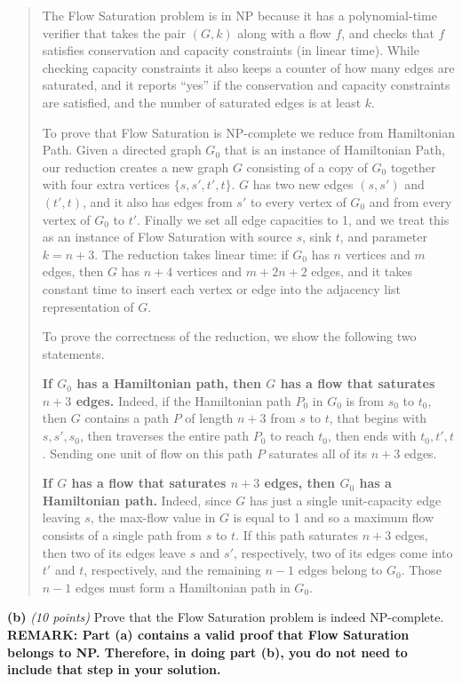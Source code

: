 \documentclass[11pt]{article}
\def\gap{0.1in}
\def\bigap{0.25in}
\begin{document}
\begin{quotation}
The {\sc Flow Saturation} problem is in NP because it has
a polynomial-time verifier that takes the pair $(G,k)$ along
with a flow $f$, and checks that $f$ satisfies conservation
and capacity constraints (in linear time).  While checking
capacity constraints it also keeps a counter of how many
edges are saturated, and it reports ``yes'' if the conservation
and capacity constraints are satisfied, and the number of 
saturated edges is at least $k$.

To prove that {\sc Flow Saturation} is NP-complete we reduce
from {\sc Hamiltonian Path}.  Given a directed graph $G_0$ that
is an instance of {\sc Hamiltonian Path}, our reduction creates
a new graph $G$ consisting of a copy of $G_0$ together with
four extra vertices $\{s,s',t',t\}$.  $G$ has two new edges $(s,s')$
and $(t',t)$, and it also has edges from $s'$ to every vertex
of $G_0$ and from every vertex of $G_0$ to $t'$.  Finally we set
all edge capacities to 1, and we treat this as an instance of
{\sc Flow Saturation} with source $s$, sink $t$, and parameter
$k=n+3$.  The reduction takes linear time: if $G_0$ has $n$
vertices and $m$ edges, then $G$ has $n+4$ vertices and 
$m+2n+2$ edges, and it takes constant time to insert each
vertex or edge into the adjacency list representation of 
$G$.

To prove the correctness of the reduction, we show the
following two statements.  

{\bf If $G_0$ has a Hamiltonian
path, then $G$ has a flow that saturates $n+3$ edges.} 
Indeed, if the Hamiltonian path $P_0$ in $G_0$ is from $s_0$
to $t_0$, then $G$ contains a path $P$ of length $n+3$ from
$s$ to $t$, that begins with $s,s',s_0$, then traverses
the entire path $P_0$ to reach $t_0$, then ends with $t_0,t',t$.
Sending one unit of flow on this path $P$ saturates all of
its $n+3$ edges.  

{\bf If $G$ has a flow that saturates 
$n+3$ edges, then $G_0$ has a Hamiltonian path.}  Indeed,
since $G$ has just a single unit-capacity edge leaving $s$,
the max-flow value in $G$ is equal to 1 and so a maximum
flow consists of a single path from $s$ to $t$.  If this 
path saturates $n+3$ edges, then two of its edges leave
$s$ and $s'$, respectively, two of its edges come into 
$t'$ and $t$, respectively, and the remaining $n-1$ edges
belong to $G_0$.  Those $n-1$ edges must form a Hamiltonian
path in $G_0$.
\end{quotation}
\vskip \gap
{\bf (b)} { \em (10 points)} 
Prove that 
the {\sc Flow Saturation} problem is indeed NP-complete.
\vskip \gap
{\bf REMARK:  Part (a) contains a valid proof that {\sc Flow
Saturation} belongs to NP.
Therefore, in doing part (b), you do not need to
include that step in your solution.}



\vskip \bigap

\end{document}
